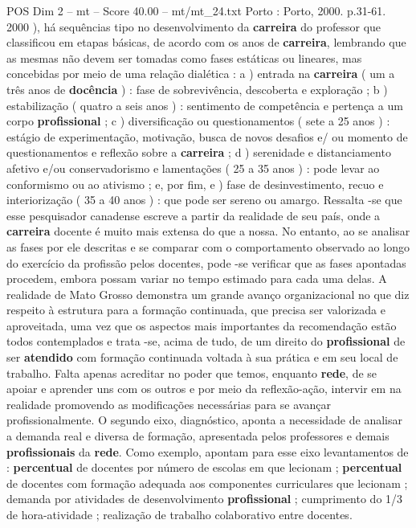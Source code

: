 \begin{textsample}{POS Dim 2 – mt – Score 40.00 – mt/mt\_24.txt}
Porto : Porto, 2000. p.31-61. 2000 ), há sequências tipo no desenvolvimento da \textbf{carreira} do professor que classificou em etapas básicas, de acordo com os anos de \textbf{carreira}, lembrando que as mesmas não devem ser tomadas como fases estáticas ou lineares, mas concebidas por meio de uma relação dialética : a ) entrada na \textbf{carreira} ( um a três anos de \textbf{docência} ) : fase de sobrevivência, descoberta e exploração ; b ) estabilização ( quatro a seis anos ) : sentimento de competência e pertença a um corpo \textbf{profissional} ; c ) diversificação ou questionamentos ( sete a 25 anos ) : estágio de experimentação, motivação, busca de novos desafios e/ ou momento de questionamentos e reflexão sobre a \textbf{carreira} ; d ) serenidade e distanciamento afetivo e/ou conservadorismo e lamentações ( 25 a 35 anos ) : pode levar ao conformismo ou ao ativismo ; e, por fim, e ) fase de desinvestimento, recuo e interiorização ( 35 a 40 anos ) : que pode ser sereno ou amargo.
Ressalta -se que esse pesquisador canadense escreve a partir da realidade de seu país, onde a \textbf{carreira} docente é muito mais extensa do que a nossa.
No entanto, ao se analisar as fases por ele descritas e se comparar com o comportamento observado ao longo do exercício da profissão pelos docentes, pode -se verificar que as fases apontadas procedem, embora possam variar no tempo estimado para cada uma delas.
A realidade de Mato Grosso demonstra um grande avanço organizacional no que diz respeito à estrutura para a formação continuada, que precisa ser valorizada e aproveitada, uma vez que os aspectos mais importantes da recomendação estão todos contemplados e trata -se, acima de tudo, de um direito do \textbf{profissional} de ser \textbf{atendido} com formação continuada voltada à sua prática e em seu local de trabalho.
Falta apenas acreditar no poder que temos, enquanto \textbf{rede}, de se apoiar e aprender uns com os outros e por meio da reflexão-ação, intervir em na realidade promovendo as modificações necessárias para se avançar profissionalmente.
O segundo eixo, diagnóstico, aponta a necessidade de analisar a demanda real e diversa de formação, apresentada pelos professores e demais \textbf{profissionais} da \textbf{rede}.
Como exemplo, apontam para esse eixo levantamentos de : \textbf{percentual} de docentes por número de escolas em que lecionam ; \textbf{percentual} de docentes com formação adequada aos componentes curriculares que lecionam ; demanda por atividades de desenvolvimento \textbf{profissional} ; cumprimento do 1/3 de hora-atividade ; realização de trabalho colaborativo entre docentes.

\end{textsample}
